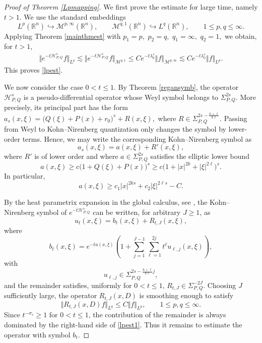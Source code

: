 \documentclass[12pt, reqno]{amsart}
\theoremstyle{definition}
\theoremstyle{remark}
\numberwithin{equation}{section}
\newcommand{\APQ}{\mathcal{H}_{P, Q}}
\begin{document}
\begin{proof}[Proof of Theorem \ref{Lpmapping}]
We first prove the estimate for large time, namely $t>1$. We use the standard embeddings
\begin{equation}
\label{inh9dj}
    L^p(\mathbb R^n)\hookrightarrow \mathcal M^{p,\infty}(\mathbb R^n),
    \qquad
    \mathcal M^{q,1}(\mathbb R^n)\hookrightarrow L^q(\mathbb R^n),
    \qquad 1\leq p,q\leq\infty .
\end{equation}
Applying Theorem \ref{mainthmest} with $p_1=p,\,\, p_2=q,\,\, q_1=\infty,\,\, q_2=1,$
we obtain, for $t>1$,
\[
\begin{aligned}
    \Vert e^{-t\APQ^s}f\Vert_{L^q}
    \lesssim
    \Vert e^{-t\APQ^s}f\Vert_{\mathcal M^{q,1}}       \leq
    C e^{-t\lambda_0^s}
    \Vert f\Vert_{\mathcal M^{p,\infty}}                
    \lesssim
    C e^{-t\lambda_0^s}
    \Vert f\Vert_{L^p}.
\end{aligned}
\]
This proves \eqref{lpest}.

We now consider the case $0<t\leq1$. By Theorem \ref{regansymb}, the operator $\APQ^s$ is a pseudo-differential operator whose Weyl symbol belongs to $\Sigma_{P,Q}^{2s}$. More precisely, its principal part has the form $a_s(x,\xi)
    =
    \big(Q(\xi)+P(x)+r_0\big)^s
    +
    R(x,\xi),$
where $R\in
    \Sigma_{P,Q}^{2s-\frac{k+\ell}{k\ell}}.$
Passing from Weyl to Kohn--Nirenberg quantization only changes the symbol by lower-order terms. Hence, we may write the corresponding Kohn--Nirenberg symbol as
\[
    a_s(x,\xi)=a(x,\xi)+R'(x,\xi),
\]
where $R'$ is of lower order and where $a\in\Sigma_{P,Q}^{2s}$ satisfies the elliptic lower bound
\begin{equation}
\label{lw29a}
    a(x,\xi)
    \geq
    c\big(1+Q(\xi)+P(x)\big)^s
    \geq
    c\big(1+|x|^{2k}+|\xi|^{2\ell}\big)^s .
\end{equation}
In particular,
\[
    a(x,\xi)
    \geq
    c_1 |x|^{2k s}+c_2|\xi|^{2\ell s}-C .
\]

By the heat parametrix expansion in the global calculus, see \cite[Theorem 4.5.1]{NicolaRodino}, the Kohn--Nirenberg symbol of $e^{-t\APQ^s}$ can be written, for arbitrary $J\geq1$, as
\[
    u_t(x,\xi)
    =
    b_t(x,\xi)+R_{t,J}(x,\xi),
\]
where
\[
    b_t(x,\xi)
    =
    e^{-t a(x,\xi)}
    \left(
    1+
    \sum_{j=1}^{J-1}
    \sum_{\ell=1}^{2j}
    t^\ell u_{\ell,j}(x,\xi)
    \right),
\]
with
\[
    u_{\ell,j}\in
    \Sigma_{P,Q}^{2s-\frac{k+\ell}{k\ell}j},
\]
and the remainder satisfies, uniformly for $0<t\leq1$, $R_{t,J}\in \Sigma_{P,Q}^{-2J}.$
Choosing $J$ sufficiently large, the operator $R_{t,J}(x,D)$ is smoothing enough to satisfy
\begin{equation}
\label{remLpLq}
    \Vert R_{t,J}(x,D)f\Vert_{L^q}
    \leq
    C\Vert f\Vert_{L^p},
    \qquad 1\leq p,q\leq\infty .
\end{equation}
Since $t^{-\sigma_s}\geq1$ for $0<t\leq1$, the contribution of the remainder is always dominated by the right-hand side of \eqref{lpest1}. Thus it remains to estimate the operator with symbol $b_t$.


\end{proof}
\end{document}
